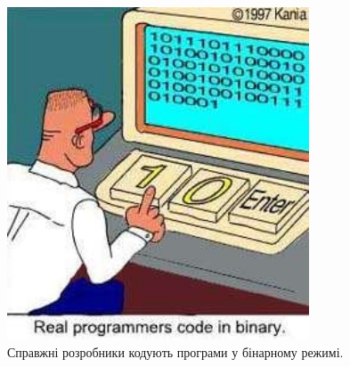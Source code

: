\begin{figure}[!b]
  \centering
  \includegraphics[width=0.8\textwidth]{images/real-programmers-binary.jpg}
  \caption{Справжні розробники кодують програми у бінарному режимі.}
  \label{PicRealDevelopers}
\end{figure}

